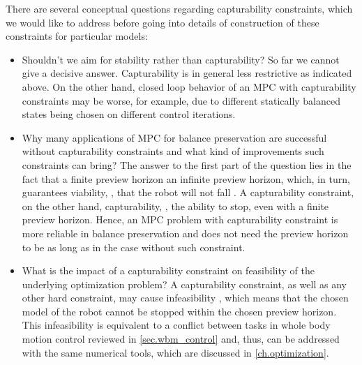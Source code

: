 There are several conceptual questions regarding capturability constraints,
which we would like to address before going into details of construction of
these constraints for particular models:
%
\begin{itemize}
    \item Shouldn't we aim for stability rather than capturability? So far we
        cannot give a decisive answer. Capturability is in general less
        restrictive as indicated above. On the other hand, closed loop behavior
        of an \ac{MPC} with capturability constraints may be worse, for
        example, due to different statically balanced states being chosen on
        different control iterations.

    \item Why many applications of \ac{MPC} for balance preservation are
        successful without capturability constraints \cite{Herdt2010auro,
        Kajita2003icra} and what kind of improvements such constraints can
        bring? The answer to the first part of the question lies in the fact
        that a finite preview horizon  an infinite preview
        horizon, which, in turn, guarantees viability, \IE, that the robot will
        not fall \cite{Wieber2008iros}. A capturability constraint, on the
        other hand,  capturability, \IE, the ability to stop,
        even with a finite preview horizon. Hence, an \ac{MPC} problem with
        capturability constraint is more reliable in balance preservation and
        does not need the preview horizon to be as long as in the case without
        such constraint.

    \item What is the impact of a capturability constraint on feasibility of
        the underlying optimization problem? A capturability constraint, as
        well as any other hard constraint, may cause infeasibility
        \cite[Chapter~8]{Rossiter2003mpc}, which means that the chosen model of
        the robot cannot be stopped within the chosen preview horizon. This
        infeasibility is equivalent to a conflict between tasks in whole body
        motion control reviewed in \cref{sec.wbm_control} and, thus, can be
        addressed with the same numerical tools, which are discussed in
        \cref{ch.optimization}.
\end{itemize}
%


